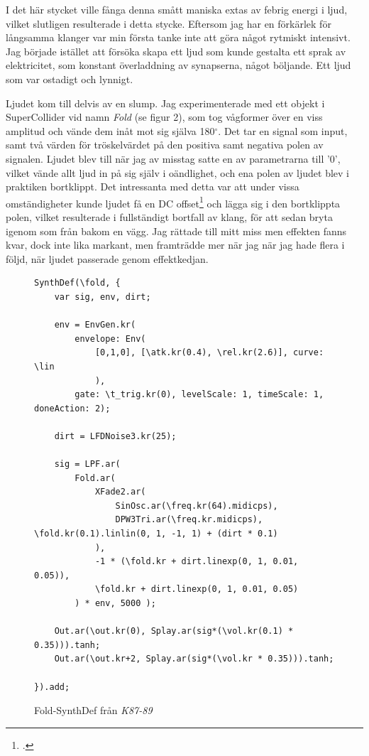 \documentclass{article}
\renewcommand{\baselinestretch}{1.5}
\begin{document}
I det här stycket ville fånga denna smått maniska extas av febrig energi i ljud, vilket slutligen resulterade
i detta stycke. Eftersom jag har en förkärlek för långsamma klanger var min första tanke inte att göra något
rytmiskt intensivt. Jag började istället att försöka skapa ett ljud som kunde gestalta ett sprak av
elektricitet, som konstant överladdning av synapserna, något böljande. Ett ljud som var ostadigt och lynnigt.

Ljudet kom till delvis av en slump. Jag experimenterade med ett objekt i SuperCollider vid namn \emph{Fold}
(se figur 2), som
tog vågformer över en viss amplitud och vände dem inåt mot sig själva 180$^{\circ}$. Det tar en signal som
input, samt två värden för tröskelvärdet på den positiva samt negativa polen av signalen. Ljudet blev till när
jag av misstag satte en av parametrarna till '0', vilket vände allt ljud in på sig själv i oändlighet, och ena
polen av ljudet blev i praktiken bortklippt. Det intressanta med detta var att under vissa omständigheter
kunde ljudet få en DC offset\footcite{dc} och lägga sig i den
bortklippta polen, vilket resulterade i fullständigt bortfall av klang, för att sedan bryta igenom som från
bakom en vägg. Jag rättade till mitt miss men effekten fanns kvar, dock inte lika markant, men framträdde mer
när jag när jag hade flera i följd, när ljudet passerade genom effektkedjan.

\pagebreak
\begin{figure}
\renewcommand{\baselinestretch}{1}
\begin{lstlisting}[style=SuperCollider-IDE]
SynthDef(\fold, {
	var sig, env, dirt;

	env = EnvGen.kr(
		envelope: Env(
			[0,1,0], [\atk.kr(0.4), \rel.kr(2.6)], curve: \lin
			), 
		gate: \t_trig.kr(0), levelScale: 1, timeScale: 1, doneAction: 2);

	dirt = LFDNoise3.kr(25);

	sig = LPF.ar( 
		Fold.ar(
			XFade2.ar(
				SinOsc.ar(\freq.kr(64).midicps), 
				DPW3Tri.ar(\freq.kr.midicps), \fold.kr(0.1).linlin(0, 1, -1, 1) + (dirt * 0.1)
			),
			-1 * (\fold.kr + dirt.linexp(0, 1, 0.01, 0.05)),
			\fold.kr + dirt.linexp(0, 1, 0.01, 0.05)
		) * env, 5000 );

	Out.ar(\out.kr(0), Splay.ar(sig*(\vol.kr(0.1) * 0.35))).tanh;
	Out.ar(\out.kr+2, Splay.ar(sig*(\vol.kr * 0.35))).tanh;

}).add;
\end{lstlisting}
\caption{Fold-SynthDef från \emph{K87-89}}
\end{figure}
\renewcommand{\baselinestretch}{1.5}
\end{document}
